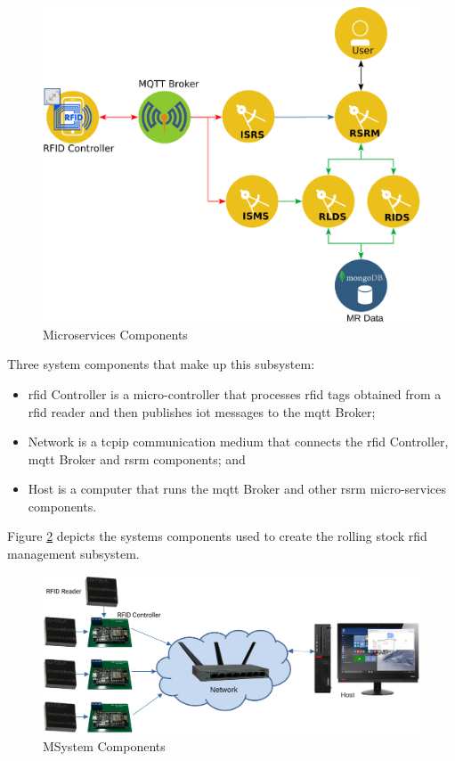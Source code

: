 \begin{figure}[H]
	\centering
		\includegraphics[scale=0.15]{rsms_design.png}
	\caption{Microservices Components}
	\label{fig:rsms-ms-components}
\end{figure}

Three system components that make up this subsystem:
\begin{itemize}
\item \gls{rfid} Controller is a micro-controller that processes \gls{rfid} tags obtained from a \gls{rfid} reader and then publishes \gls{iot} messages to the \gls{mqtt} Broker;
\item Network is a \gls{tcpip} communication medium that connects the \gls{rfid} Controller, \gls{mqtt} Broker and \gls{rsrm} components; and
\item Host is a computer that runs the \gls{mqtt} Broker and other \gls{rsrm} micro-services components.
\end{itemize}
Figure \ref{fig:rsms-system} depicts the systems components used to create the rolling stock \gls{rfid} management subsystem.

\begin{figure}[H]
	\centering
		\includegraphics[scale=0.15]{rsms_system.png}
	\caption{MSystem Components}
	\label{fig:rsms-system}
\end{figure}

